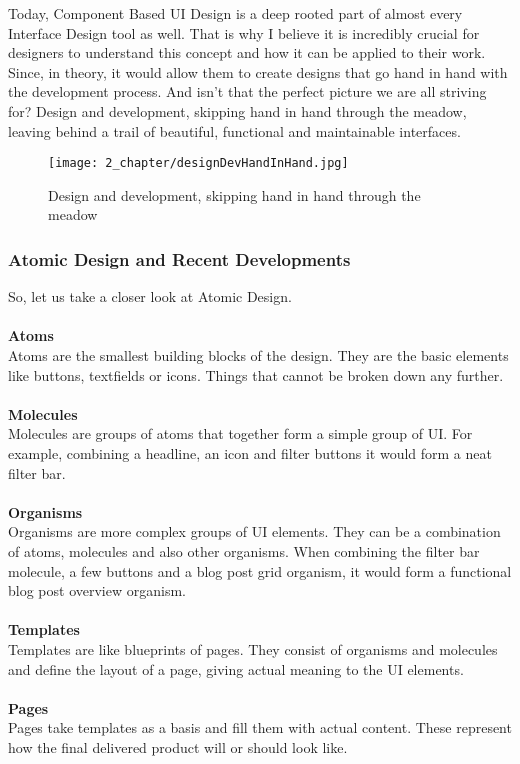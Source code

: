 Today, Component Based UI Design is a deep rooted part of almost every Interface Design tool as
well. That is why I believe it is incredibly crucial for designers to understand this concept and
how it can be applied to their work. Since, in theory, it would allow them to create designs that go
hand in hand with the development process. And isn't that the perfect picture we are all striving
for? Design and development, skipping hand in hand through the meadow, leaving behind a trail of
beautiful, functional and maintainable interfaces.

\begin{figure}[h!]
    \begin{center}
        \texttt{[image: 2\_chapter/designDevHandInHand.jpg]}
        \caption[Caption (url)]{Design and development, skipping hand in hand through the meadow}
    \end{center}
\end{figure}

\subsubsection{Atomic Design and Recent Developments}
So, let us take a closer look at Atomic Design. \\\\
\textbf{Atoms} \\
Atoms are the smallest building blocks of the design. They are the basic elements like buttons,
textfields or icons. Things that cannot be broken down any further. \\\\
\textbf{Molecules} \\
Molecules are groups of atoms that together form a simple group of UI. For example, combining
a headline, an icon and filter buttons it would form a neat filter bar. \\\\
\textbf{Organisms} \\
Organisms are more complex groups of UI elements. They can be a combination of atoms, molecules and
also other organisms. When combining the filter bar molecule, a few buttons and a blog post grid
organism, it would form a functional blog post overview organism. \\\\
\textbf{Templates} \\
Templates are like blueprints of pages. They consist of organisms and molecules and define the
layout of a page, giving actual meaning to the UI elements. \\\\
\textbf{Pages}\\
Pages take templates as a basis and fill them with actual content. These represent how the final
delivered product will or should look like. \\

